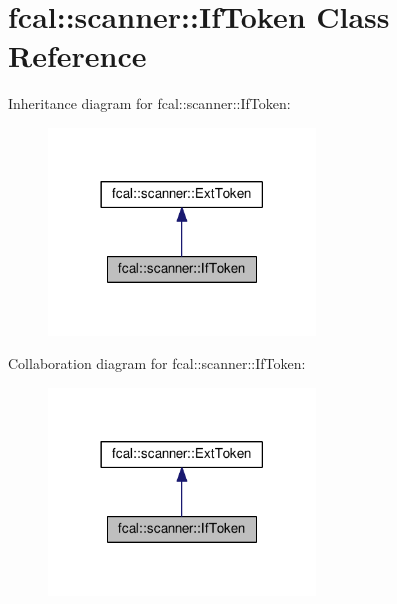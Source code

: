 \hypertarget{classfcal_1_1scanner_1_1IfToken}{}\section{fcal\+:\+:scanner\+:\+:If\+Token Class Reference}
\label{classfcal_1_1scanner_1_1IfToken}


Inheritance diagram for fcal\+:\+:scanner\+:\+:If\+Token\+:\nopagebreak
\begin{figure}[H]
\begin{center}
\leavevmode
\includegraphics[width=201pt]{classfcal_1_1scanner_1_1IfToken__inherit__graph}
\end{center}
\end{figure}


Collaboration diagram for fcal\+:\+:scanner\+:\+:If\+Token\+:\nopagebreak
\begin{figure}[H]
\begin{center}
\leavevmode
\includegraphics[width=201pt]{classfcal_1_1scanner_1_1IfToken__coll__graph}
\end{center}
\end{figure}
